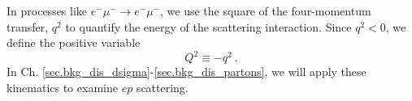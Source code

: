 In processes like $e^-\mu^-\rightarrow e^-\mu^-$, we use the square of the four-momentum transfer, $q^2$ to quantify the energy of the scattering interaction. Since $q^2<0$, we define the positive variable 
\begin{equation}
    Q^2 \equiv -q^2 \ .
\end{equation} 
In Ch. \ref{sec.bkg_dis_dsigma}-\ref{sec.bkg_dis_partons}, we will apply these kinematics to examine $ep$ scattering.




